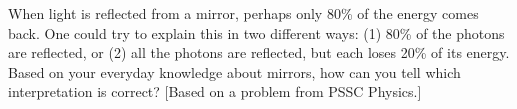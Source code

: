 When light is reflected from a mirror, perhaps only 80\%
of the energy comes back. One could try to explain this in
two different ways: (1) 80\% of the photons are reflected,
or (2) all the photons are reflected, but each loses 20\% of
its energy. Based on your everyday knowledge about mirrors,
how can you tell which interpretation is correct? [Based on
a problem from PSSC Physics.]
